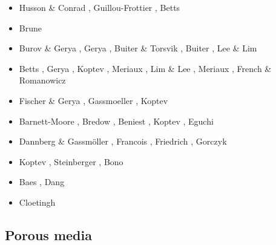 \begin{scriptsize}
\begin{itemize}
\item[\twothousandtwelve] Husson \& Conrad \cite{huco12}, Guillou-Frottier \etal \cite{gubc12},
                          Betts \etal \cite{bemm12}
\item[\twothousandthirteen] Brune \etal \cite{brps13}
\item[\twothousandfourteen] Burov \& Gerya \cite{buge14}, Gerya \cite{gery14b},
                            Buiter \& Torsvik \cite{buto14}, Buiter \cite{buit14},
                            Lee \& Lim \cite{leli14}
\item[\twothousandfifteen] Betts \etal \cite{bemm15}, Gerya \etal \cite{gesb15},
                           Koptev \etal \cite{kocb15}, Meriaux \etal \cite{meds15},
                           Lim \& Lee \cite{lile15}, Meriaux \etal \cite{medd15},
                           French \& Romanowicz \cite{frro15}
\item[\twothousandsixteen] Fischer \& Gerya \cite{fige16}, Gassmoeller \etal \cite{gadb16},
                           Koptev \etal \cite{kobc16}
\item[\twothousandseventeen] Barnett-Moore \etal \cite{bahf17}, Bredow \etal \cite{brsg17},
                             Beniest \etal \cite{bekb17}, Koptev \etal \cite{kocb17},
                             Eguchi \etal \cite{egim17}
\item[\twothousandeighteen] Dannberg \& Gassm\"oller \cite{daga18}, Francois \etal \cite{frkc18},
                            Friedrich \etal \cite{frbr18}, Gorczyk \etal \cite{gomb18}
\item[\twothousandnineteen] Koptev \etal \cite{kobg19}, Steinberger \etal \cite{stbl19},
                            Bono \etal \cite{botb19}
\item[\twothousandtwenty] Baes \etal \cite{basg20,basg20b}, Dang \etal \cite{dazl20}
\item[\twothousandtwentyone] Cloetingh \etal \cite{clkk21}
\end{itemize}
\end{scriptsize}

\subsection{Porous media} 

